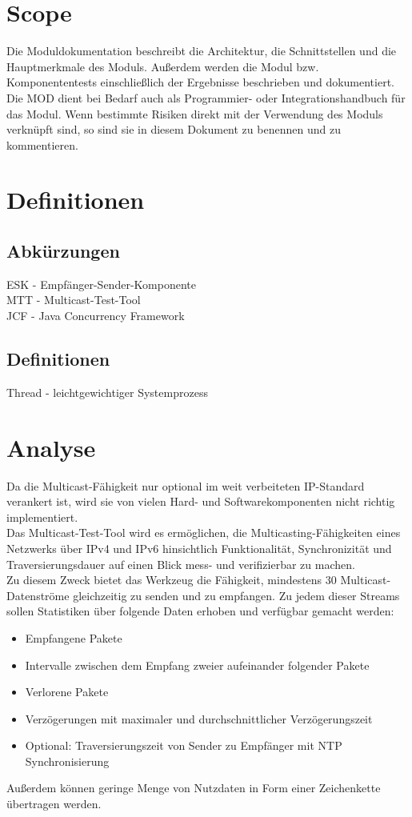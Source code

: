 
\chapter{Scope}
Die Moduldokumentation beschreibt die Architektur, die Schnittstellen
und die Hauptmerkmale des Moduls. Außerdem werden die Modul bzw. Komponententests
einschließlich der Ergebnisse beschrieben und dokumentiert.
Die MOD dient bei Bedarf auch als Programmier- oder Integrationshandbuch für das
Modul. Wenn bestimmte Risiken direkt mit der Verwendung des Moduls verknüpft sind,
so sind sie in diesem Dokument zu benennen und zu kommentieren.

\chapter{Definitionen}

\section{Abkürzungen}
ESK - Empfänger-Sender-Komponente\\
MTT - Multicast-Test-Tool\\
JCF - Java Concurrency Framework

\section{Definitionen}
Thread - leichtgewichtiger Systemprozess

\chapter{Analyse}
Da die Multicast-Fähigkeit nur optional im weit verbeiteten IP-Standard
verankert ist, wird sie von vielen Hard- und Softwarekomponenten nicht richtig
implementiert.\\
Das Multicast-Test-Tool wird es ermöglichen, die Multicasting-Fähigkeiten eines
Netzwerks über IPv4 und IPv6 hinsichtlich Funktionalität, Synchronizität und
Traversierungsdauer auf einen Blick mess- und verifizierbar zu machen.\\
Zu diesem Zweck bietet das Werkzeug die Fähigkeit, mindestens 30
Multicast-Datenströme gleichzeitig zu senden und zu empfangen. Zu jedem dieser
Streams sollen Statistiken über folgende Daten erhoben und verfügbar gemacht
werden:
\begin{itemize}
  \item Empfangene Pakete
  \item Intervalle zwischen dem Empfang zweier aufeinander
folgender Pakete
\item Verlorene Pakete
\item Verzögerungen mit maximaler und
durchschnittlicher Verzögerungszeit
\item Optional: Traversierungszeit von Sender zu Empfänger mit NTP
Synchronisierung
\end{itemize}
Außerdem können geringe Menge von Nutzdaten in Form einer Zeichenkette
übertragen werden.\\


